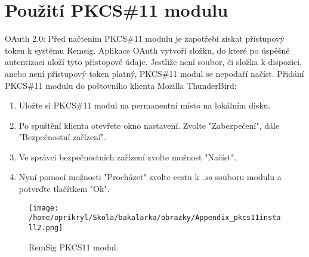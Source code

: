 \documentclass[]{fithesis3}
\begin{document}
\chapter{Použití PKCS\#11 modulu}
	OAuth 2.0: \newline
	Před načtením PKCS\#11 modulu je zapotřebí získat přístupový token k systému Remsig. Aplikace OAuth vytvoří složku, do které po úspěšné autentizaci uloží tyto přistopové údaje. Jestliže není soubor, či složka k dispozici, anebo není přístupový token platný, PKCS\#11 modul se nepodaří načíst.
	\newline
	\newline
	Přidání PKCS\#11 modulu do poštovního klienta Mozilla ThunderBird:
	\begin{enumerate}
		\item Uložte si PKCS\#11 modul na permanentní místo na lokálním disku.
		\item Po spuštění klienta otevřete okno nastavení. Zvolte "Zabezpečení", dále 					"Bezpečnostní zařízení".
		\item Ve správci bezpečnostních zařízení zvolte možnost "Načíst".
		\item Nyní pomocí možnosti "Procházet" zvolte cestu k \textit{.so} souboru modulu a 				potvrďte tlačítkem "Ok".
	\end{enumerate}
	
		\begin{figure}[!ht]
  			\begin{minipage}{1.00\textwidth}
    				\texttt{[image: /home/oprikryl/Skola/bakalarka/obrazky/Appendix\_pkcs11install2.png]}
  			\end{minipage}
 			\caption{RemSig PKCS11 modul.}
  			\label{fig:RemSig PKCS11 modul.}
		\end{figure}	
	
\end{document}
